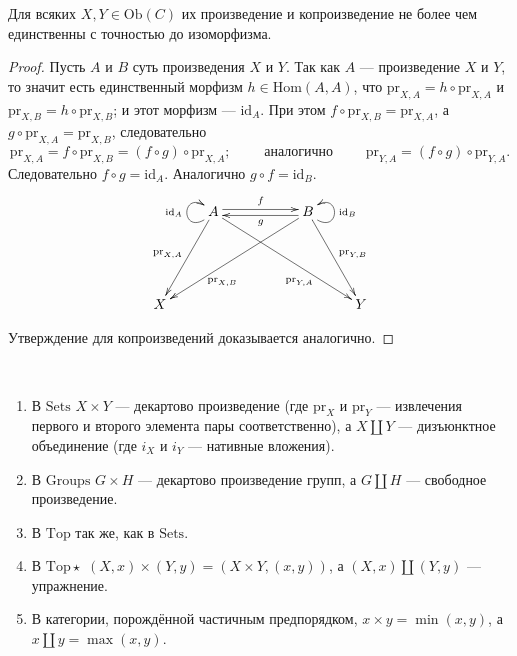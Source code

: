 \documentclass[12pt,a4paper]{article}
\newcommand{\Hom}{\mathrm{Hom}}
\newcommand{\Ob}{\mathrm{Ob}}
\newcommand{\id}{\mathrm{id}}
\newcommand{\Sets}{\mathrm{Sets}}
\newcommand{\Groups}{\mathrm{Groups}}
\newcommand{\Top}{\mathrm{Top}}
\newcommand{\Topstar}{\mathrm{Top\star}}
\newcommand{\pr}{\mathrm{pr}}
\begin{document}
    \begin{lemma}
        Для всяких $X, Y \in \Ob(C)$ их произведение и копроизведение не более чем единственны с точностью до изоморфизма.
    \end{lemma}

    \begin{proof}
        Пусть $A$ и $B$ суть произведения $X$ и $Y$. Так как $A$ --- произведение $X$ и $Y$, то значит есть единственный морфизм $h \in \Hom(A, A)$, что $\pr_{X, A} = h \circ \pr_{X, A}$ и $\pr_{X, B} = h \circ \pr_{X, B}$; и этот морфизм --- $\id_A$. При этом $f \circ \pr_{X, B} = \pr_{X, A}$, а $g \circ \pr_{X, A} = \pr_{X, B}$, следовательно
        \[
            \pr_{X, A} = f \circ \pr_{X, B} = (f \circ g) \circ \pr_{X, A};
            \qquad \text{ аналогично } \qquad
            \pr_{Y, A} = (f \circ g) \circ \pr_{Y, A}.
        \]
        Следовательно $f \circ g = \id_A$. Аналогично $g \circ f = \id_B$.
        \[
            \xymatrix{
                &A \ar@(dl,ul)[]^{\id_A} \ar[ddl]_{\pr_{X, A}} \ar[ddrrr]_(.66){\pr_{Y, A}} \ar@<0.5ex>[rr]^{f} && B \ar@(dr,ur)[]_{\id_B} \ar[ddlll]^(.66){\pr_{X, B}} \ar[ddr]^{\pr_{Y, B}} \ar@<0.5ex>[ll]^{g}\\\\
                X &&&& Y
            }
        \]

        Утверждение для копроизведений доказывается аналогично.
    \end{proof}

    \begin{example}\ 
        \begin{enumerate}
            \item В $\Sets$ $X \times Y$ --- декартово произведение (где $\pr_X$ и $\pr_Y$ --- извлечения первого и второго элемента пары соответственно), а $X \amalg Y$ --- дизъюнктное объединение (где $i_X$ и $i_Y$ --- нативные вложения).
            \item В $\Groups$ $G \times H$ --- декартово произведение групп, а $G \amalg H$ --- свободное произведение.
            \item В $\Top$ так же, как в $\Sets$.
            \item В $\Topstar$ $(X, x) \times (Y, y) = (X \times Y, (x, y))$, а $(X, x) \amalg (Y, y)$ --- упражнение.
            \item В категории, порождённой частичным предпорядком, $x \times y = \min(x, y)$, а $x \amalg y = \max(x, y)$.
        \end{enumerate}
    \end{example}
\end{document}
